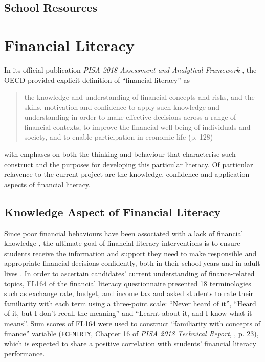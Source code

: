 \documentclass[a4paper,11pt,UKenglish,twoside,openright]{report}\usepackage[]{graphicx}\usepackage[]{color}
\begin{document}
\subsection{School Resources}






\section{Financial Literacy}\label{sec:flit}

In its official publication \textit{PISA 2018 Assessment and Analytical Framework} \parencite{PISAframework}, the OECD provided explicit definition of ``financial literacy'' as
\vspace{-1em} %
    \blockquote{the knowledge and understanding of financial concepts and risks, and the skills, motivation and confidence to apply such knowledge and understanding in order to make effective decisions across a range of financial contexts, to improve the financial well-being of individuals and society, and to enable participation in economic life (p. 128)}
\vspace{-1em} %
with emphases on both the thinking and behaviour that characterise such construct and the purposes for developing this particular literacy. Of particular relavence to the current project are the knowledge, confidence and application aspects of financial literacy.


\subsection{Knowledge Aspect of Financial Literacy}

Since poor financial behaviours have been associated with a lack of financial knowledge \parencite{hastings:2013, lusardi:2014}, the ultimate goal of financial literacy interventions is to ensure students receive the information and support they need to make responsible and appropriate financial decisions confidently, both in their school years and in adult lives \parencite{PISAvol4}. In order to ascertain candidates' current understanding of finance-related topics, \textsf{FL164} of the financial literacy questionnaire presented 18 terminologies such as exchange rate, budget, and income tax and asked students to rate their familiarity with each term using a three-point scale: ``Never heard of it'', ``Heard of it, but I don't recall the meaning'' and ``Learnt about it, and I know what it means''. Sum scores of \textsf{FL164} were used to construct ``familiarity with concepts of finance'' variable (\texttt{FCFMLRTY}, Chapter 16 of \textit{PISA 2018 Technical Report}, \textcite{PISAtech}, p. 23), which is expected to share a positive correlation with students' financial literacy performance.
\end{document}
